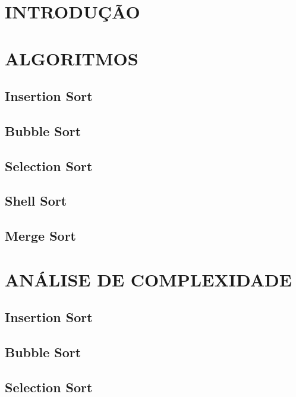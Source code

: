 \documentclass[12pt,arial]{article}
\begin{document}
		\tableofcontents
		\newpage
  
		\section{INTRODUÇÃO}
		
		\newpage

            \section{ALGORITMOS}
		\subsection{Insertion Sort}
		
		\newpage
		\subsection{Bubble Sort}
		
		\newpage
		\subsection{Selection Sort}
		
		\newpage
		\subsection{Shell Sort}
		
		\newpage
        \subsection{Merge Sort}
		
		\newpage
  
            \section{ANÁLISE DE COMPLEXIDADE}
		\subsection{Insertion Sort}
		
	    \vspace*{1.5cm}
		\subsection{Bubble Sort}
		
	    \vspace*{1.5cm}
		\subsection{Selection Sort}
		
	    \vspace*{1.5cm}
\end{document}
